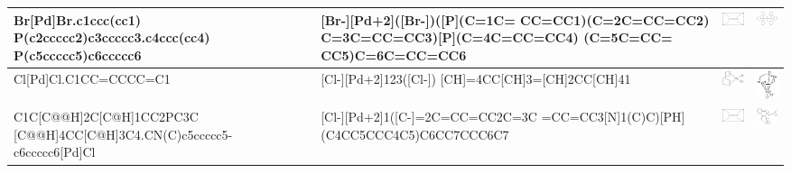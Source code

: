 \begin{landscape}
\begin{longtable}{m{7cm}m{8cm}cc}
 Br[Pd]Br.c1ccc(cc1) P(c2ccccc2)c3ccccc3.c4ccc(cc4) P(c5ccccc5)c6ccccc6 & 
 [Br-][Pd+2]([Br-])([P](C=1C= CC=CC1)(C=2C=CC=CC2) C=3C=CC=CC3)[P](C=4C=CC=CC4) (C=5C=CC= CC5)C=6C=CC=CC6 & 
 \includegraphics[width=2.2cm]{imagenes/placeholder.png} & 
 \includegraphics[width=2.2cm]{imagenes/sciFinder/pdf/trans-Dibromobis(triphenylphosphine)palladium(II).pdf} \\
\hline

 Cl[Pd]Cl.C1CC=CCCC=C1 & 
 [Cl-][Pd+2]123([Cl-]) [CH]=4CC[CH]3=[CH]2CC[CH]41 & 
 \includegraphics[width=2.2cm]{imagenes/sigmaAldrich/Dichloro(1,5-cyclooctadiene)palladium(II).png} & 
 \includegraphics[width=2.2cm]{imagenes/sciFinder/pdf/Dichloro(1,5-cyclooctadiene)palladium(II).pdf} \\
\hline

 C1C[C@@H]2C[C@H]1CC2PC3C [C@@H]4CC[C@H]3C4.CN(C)c5ccccc5-c6ccccc6[Pd]Cl & 
 [Cl-][Pd+2]1([C-]=2C=CC=CC2C=3C =CC=CC3[N]1(C)C)[PH] (C4CC5CCC4C5)C6CC7CCC6C7 & 
 \includegraphics[width=2.2cm]{imagenes/placeholder.png} & 
 \includegraphics[width=2.2cm]{imagenes/sciFinder/pdf/SK-CC 01A.pdf} \\
\hline


\end{longtable}
\end{landscape}
